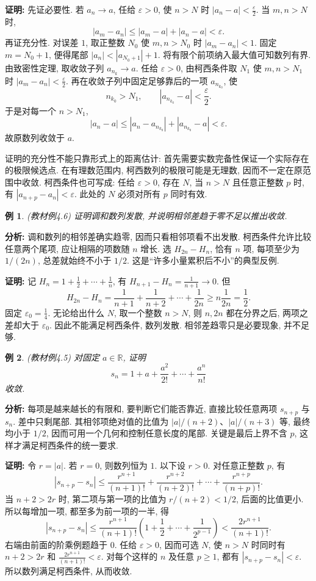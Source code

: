 \documentclass[UTF8,openany]{ctexbook}
\theoremstyle{chinesetextbook}
\newtheorem{example}{例}[section]
\newenvironment{cnproof}{\par\indent\textbf{证明:} \ignorespaces}{\par}
\begin{document}
\begin{cnproof}
先证必要性. 若 $a_n\to a$, 任给 $\varepsilon>0$, 使 $n>N$ 时 $\displaystyle |a_n-a|<\frac\varepsilon2$. 当 $m,n>N$ 时,
\[
|a_m-a_n|\le|a_m-a|+|a_n-a|<\varepsilon.
\]
再证充分性. 对误差 $1$, 取正整数 $N_0$ 使 $m,n>N_0$ 时 $|a_m-a_n|<1$. 固定 $m=N_0+1$, 便得尾部 $|a_n|<|a_{N_0+1}|+1$. 将有限个前项纳入最大值可知数列有界. 由致密性定理, 取收敛子列 $a_{n_k}\to a$.
任给 $\varepsilon>0$, 由柯西条件取 $N_1$ 使 $m,n>N_1$ 时 $\displaystyle |a_m-a_n|<\frac\varepsilon2$. 再在收敛子列中固定足够靠后的一项 $a_{n_{k_0}}$, 使
\[
n_{k_0}>N_1,\qquad |a_{n_{k_0}}-a|<\frac\varepsilon2.
\]
于是对每一个 $n>N_1$,
\[
|a_n-a|\le|a_n-a_{n_{k_0}}|+|a_{n_{k_0}}-a|<\varepsilon.
\]
故原数列收敛于 $a$.
\end{cnproof}
证明的充分性不能只靠形式上的距离估计: 首先需要实数完备性保证一个实际存在的极限候选点. 在有理数范围内, 柯西数列的极限可能是无理数, 因而不一定在原范围中收敛.
柯西条件也可写成: 任给 $\varepsilon>0$, 存在 $N$, 当 $n>N$ 且任意正整数 $p$ 时, 有 $|a_{n+p}-a_n|<\varepsilon$. 此处的 $N$ 必须对所有 $p$ 同时有效.
\begin{example}
(教材例4.6) 证明调和数列发散, 并说明相邻差趋于零不足以推出收敛.
\end{example}
\par\indent\textbf{分析:} 调和数列的相邻差确实趋零, 因而只看相邻项看不出发散. 柯西条件允许比较任意两个尾项, 应让相隔的项数随 $n$ 增长. 选 $H_{2n}-H_n$, 恰有 $n$ 项, 每项至少为 $1/(2n)$, 总差就始终不小于 $1/2$. 这是“许多小量累积后不小”的典型反例.
\begin{cnproof}
记 $\displaystyle H_n=1+\frac12+\cdots+\frac1n$, 有 $\displaystyle H_{n+1}-H_n=\frac1{n+1}\to0$. 但
\[
H_{2n}-H_n=\frac1{n+1}+\frac1{n+2}+\cdots+\frac1{2n}
\ge n\frac1{2n}=\frac12.
\]
固定 $\displaystyle\varepsilon_0=\frac14$. 无论给出什么 $N$, 取一个整数 $n>N$, 则 $n,2n$ 都在分界之后, 两项之差却大于 $\varepsilon_0$. 因此不能满足柯西条件, 数列发散. 相邻差趋零只是必要现象, 并不足够.
\end{cnproof}
\begin{example}
(教材例4.5) 对固定 $a\in\mathbb R$, 证明
\[
s_n=1+a+\frac{a^2}{2!}+\cdots+\frac{a^n}{n!}
\]
收敛.
\end{example}
\par\indent\textbf{分析:} 每项是越来越长的有限和, 要判断它们能否靠近, 直接比较任意两项 $s_{n+p}$ 与 $s_n$. 差中只剩尾部. 其相邻项绝对值的比值为 $|a|/(n+2)$、$|a|/(n+3)$ 等, 最终均小于 $1/2$, 因而可用一个几何和控制任意长度的尾部. 关键是最后上界不含 $p$, 这样才满足柯西条件的统一要求.
\begin{cnproof}
令 $r=|a|$. 若 $r=0$, 则数列恒为 $1$. 以下设 $r>0$. 对任意正整数 $p$, 有
\[
|s_{n+p}-s_n|\le\frac{r^{n+1}}{(n+1)!}+\frac{r^{n+2}}{(n+2)!}+\cdots+\frac{r^{n+p}}{(n+p)!}.
\]
当 $n+2>2r$ 时, 第二项与第一项的比值为 $r/(n+2)<1/2$, 后面的比值更小. 所以每增加一项, 都至多为前一项的一半, 得
\[
|s_{n+p}-s_n|
\le\frac{r^{n+1}}{(n+1)!}\left(1+\frac12+\cdots+\frac1{2^{p-1}}\right)
<\frac{2r^{n+1}}{(n+1)!}.
\]
右端由前面的阶乘例题趋于 $0$. 任给 $\varepsilon>0$, 因而可选 $N$, 使 $n>N$ 时同时有 $n+2>2r$ 和 $\displaystyle\frac{2r^{n+1}}{(n+1)!}<\varepsilon$. 对每个这样的 $n$ 及任意 $p\ge1$, 都有 $|s_{n+p}-s_n|<\varepsilon$. 所以数列满足柯西条件, 从而收敛.
\end{cnproof}
\end{document}
